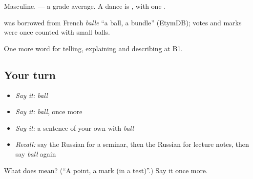 Masculine. \emph{ } — a grade average. A dance is \emph{}, with one \emph{}.

\begin{cousinweb}
\textbf{} was borrowed from French \emph{balle} \textquotedblleft{}a ball, a bundle\textquotedblright{} (EtymDB); votes and marks were once counted with small balls.
\end{cousinweb}

\begin{grammarlens}[title={What you've built}]
One more word for telling, explaining and describing at B1.
\end{grammarlens}

\subsection*{Your turn}
\begin{itemize}
\raggedright
  \item \emph{Say it:} \emph{ball}
  \item \emph{Say it:} \emph{ball}, once more
  \item \emph{Say it:} a sentence of your own with \emph{ball}
  \item \emph{Recall:} say the Russian for a seminar, then the Russian for lecture notes, then say \emph{ball} again
\end{itemize}

\begin{tcolorbox}[breakable,colback=teal!4,colframe=teal!35!black,title={Before you move on}]
What does  mean? (\textquotedblleft{}A point, a mark (in a test)\textquotedblright{}.) Say it once more.
\end{tcolorbox}
